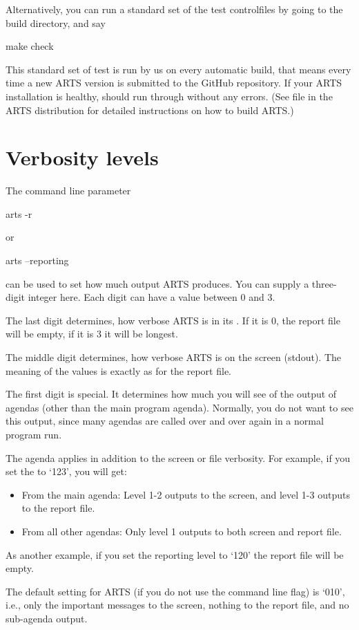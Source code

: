 Alternatively, you can run a standard set of the test controlfiles by
going to the build directory, and say
\begin{code}
  make check
\end{code}
This standard set of test is run by us on every automatic build, that
means every time a new ARTS version is submitted to the GitHub
repository. If your ARTS installation is healthy,  should run through without any errors. (See file
 in the ARTS distribution for detailed instructions
on how to build ARTS.)\\



\section{Verbosity levels}

The command line parameter 
\begin{code}
  arts -r
\end{code}
or
\begin{code}
  arts --reporting
\end{code}
can be used to set how much output ARTS produces. You can supply a
three-digit integer here. Each digit can have a value between 0 and 3.

The last digit determines, how verbose ARTS is in its
. If it is 0, the report file will be empty, if
it is 3 it will be longest.

The middle digit determines, how verbose ARTS is on the screen
(stdout). The meaning of the values is exactly as for the report
file. 

The first digit is special. It determines how much you will see of the
output of agendas (other than the main program agenda). Normally, you
do not want to see this output, since many agendas are called over and
over again in a normal program run. 

The agenda  applies in addition to the screen or
file verbosity. For example, if you set the  to `123', you will get:
\begin{itemize}
\item From the main agenda: Level 1-2 outputs to the screen, and level
  1-3 outputs to the report file.
\item From all other agendas: Only level 1 outputs to both screen and
  report file.
\end{itemize}
As another example, if you set the reporting level to `120' the
report file will be empty.

The default setting for ARTS (if you do not use the command line flag)
is `010', i.e., only the important messages to the screen, nothing to
the report file, and no sub-agenda output.


